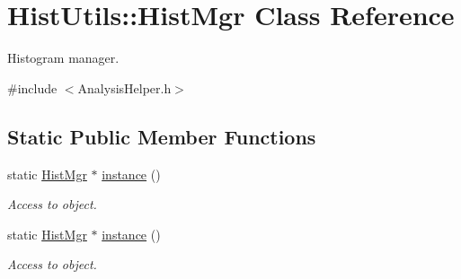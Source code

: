 \hypertarget{classHistUtils_1_1HistMgr}{}\section{Hist\+Utils\+:\+:Hist\+Mgr Class Reference}
\label{classHistUtils_1_1HistMgr}


Histogram manager.  




{\ttfamily \#include $<$Analysis\+Helper.\+h$>$}

\subsection*{Static Public Member Functions}
\begin{DoxyCompactItemize}
\item 
static \hyperlink{classHistUtils_1_1HistMgr}{Hist\+Mgr} $\ast$ \hyperlink{classHistUtils_1_1HistMgr_a470a4d54f8b7f7e305aa43fb48f99e9c}{instance} ()
\begin{DoxyCompactList}\small\item\em Access to object. \end{DoxyCompactList}\item 
static \hyperlink{classHistUtils_1_1HistMgr}{Hist\+Mgr} $\ast$ \hyperlink{classHistUtils_1_1HistMgr_a470a4d54f8b7f7e305aa43fb48f99e9c}{instance} ()
\begin{DoxyCompactList}\small\item\em Access to object. \end{DoxyCompactList}\end{DoxyCompactItemize}
